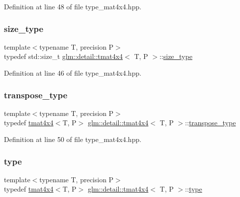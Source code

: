 Definition at line 48 of file type\+\_\+mat4x4.\+hpp.

\mbox{\label{structglm_1_1detail_1_1tmat4x4_a902f3edef1874ef653562bdd9947fcf9}} 
\subsubsection{\texorpdfstring{size\+\_\+type}{size\_type}}
{\footnotesize\ttfamily template$<$typename T, precision P$>$ \\
typedef std\+::size\+\_\+t \hyperlink{structglm_1_1detail_1_1tmat4x4}{glm\+::detail\+::tmat4x4}$<$ T, P $>$\+::\hyperlink{structglm_1_1detail_1_1tmat4x4_a902f3edef1874ef653562bdd9947fcf9}{size\+\_\+type}}



Definition at line 46 of file type\+\_\+mat4x4.\+hpp.

\mbox{\label{structglm_1_1detail_1_1tmat4x4_a92072726f44cd765df13235e7a1c45a8}} 
\subsubsection{\texorpdfstring{transpose\+\_\+type}{transpose\_type}}
{\footnotesize\ttfamily template$<$typename T, precision P$>$ \\
typedef \hyperlink{structglm_1_1detail_1_1tmat4x4}{tmat4x4}$<$T, P$>$ \hyperlink{structglm_1_1detail_1_1tmat4x4}{glm\+::detail\+::tmat4x4}$<$ T, P $>$\+::\hyperlink{structglm_1_1detail_1_1tmat4x4_a92072726f44cd765df13235e7a1c45a8}{transpose\+\_\+type}}



Definition at line 50 of file type\+\_\+mat4x4.\+hpp.

\mbox{\label{structglm_1_1detail_1_1tmat4x4_a692f6b423a90288bd4043a6c447f7864}} 
\subsubsection{\texorpdfstring{type}{type}}
{\footnotesize\ttfamily template$<$typename T, precision P$>$ \\
typedef \hyperlink{structglm_1_1detail_1_1tmat4x4}{tmat4x4}$<$T, P$>$ \hyperlink{structglm_1_1detail_1_1tmat4x4}{glm\+::detail\+::tmat4x4}$<$ T, P $>$\+::\hyperlink{structglm_1_1detail_1_1tmat4x4_a692f6b423a90288bd4043a6c447f7864}{type}}



